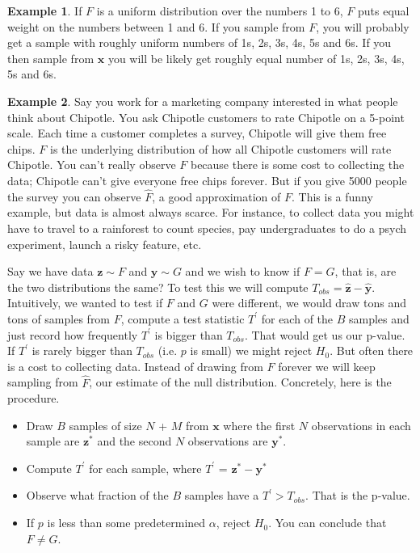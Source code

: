 \documentclass[]{article}
\theoremstyle{definition}
\newtheorem{exmp}{Example}[section]
\begin{document}
\begin{exmp}
If $F$ is a uniform distribution over the numbers 1 to 6, $F$ puts equal weight on the numbers between 1 and 6. If you sample from $F$, you will probably get a sample with roughly uniform numbers of 1s, 2s, 3s, 4s, 5s and 6s. If you then sample from $\bm{x}$ you will be likely get roughly equal number of 1s, 2s, 3s, 4s, 5s and 6s.
\end{exmp}


\begin{exmp}
Say you work for a marketing company interested in what people think about Chipotle. You ask Chipotle customers to rate Chipotle on a 5-point scale. Each time a customer completes a survey, Chipotle will give them free chips. $F$ is the underlying distribution of how all Chipotle customers will rate Chipotle. You can't really observe $F$ because there is some cost to collecting the data; Chipotle can't give everyone free chips forever.  But if you give 5000 people the survey you can observe $\hat{F}$, a good approximation of $F$. This is a funny example, but data is almost always scarce. For instance, to collect data you might have to travel to a rainforest to count species, pay undergraduates to do a psych experiment, launch a risky feature, etc. 
\end{exmp}

Say we have data $\bm{z} \sim F$ and $\bm{y} \sim G$ and we wish to know if $F=G$, that is, are the two distributions the same? To test this we will compute $T_{obs}=\hat{\bm{z}} - \hat{\bm{y}}$. Intuitively, we wanted to test if ${F}$ and ${G}$ were different, we would draw tons and tons of samples from ${F}$, compute a test statistic $T^{\prime}$ for each of the $B$ samples and just record how frequently $T^{\prime}$ is bigger than $T_{obs}$. That would get us our p-value. If $T^{\prime}$ is rarely bigger than $T_{obs}$ (i.e. $p$ is small) we might reject $H_0$. But often there is a cost to collecting data. Instead of drawing from $F$ forever we will keep sampling from $\hat{F}$, our estimate of the null distribution. Concretely, here is the procedure. 

\begin{itemize}
\item Draw $B$ samples of size $N$ + $M$ from $\boldsymbol{x}$ where the first $N$ observations in each sample are $\bm{z}^*$ and the second $N$ observations are $\bm{y}^*$.
\item Compute $T^{\prime}$ for each sample, where $T^{\prime}$ = ${\bm{z}^*} - {\bm{y}^*}$
\item Observe what fraction of the $B$ samples have a $T^{\prime} > T_{obs}$. That is the p-value. 
\item If $p$ is less than some predetermined $\alpha$, reject $H_0$. You can conclude that $F \neq G$.
\end{itemize}
\end{document}
